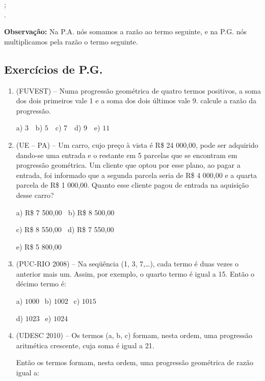 \begin{multicols*}{2}
	;\\

	.

	\textbf{Observação:} Na P.A. nós somamos a razão ao termo seguinte, e na P.G. nós multiplicamos pela razão o termo seguinte.

	\subsection{Exercícios de P.G.}

	\begin{enumerate}

		\item  (FUVEST) – Numa progressão geométrica de quatro termos positivos, a soma dos dois primeiros vale 1 e a soma dos dois últimos vale 9. calcule a razão da progressão.

		      a) $3 \ \ \ $ b) $5 \ \ \ $ c) $7 \ \ \ $ d) $9 \ \ \ $ e) $11$

		\item (UE – PA) – Um carro, cujo preço à vista é R\$ 24 000,00, pode ser adquirido dando-se uma entrada e o restante em 5 parcelas que se encontram em progressão geométrica. Um cliente que optou por esse plano, ao pagar a entrada, foi informado que a segunda parcela seria de R\$ 4 000,00 e a quarta parcela de R\$ 1 000,00. Quanto esse cliente pagou de entrada na aquisição desse carro?

		      a) R\$ 7 500,00 $ \ $ b) R\$ 8 500,00

		      c) R\$ 8 550,00 $ \ $ d) R\$ 7 550,00

		      e) R\$ 5 800,00

		\item  (PUC-RIO 2008) – Na seqüência (1, 3, 7,…), cada termo é duas vezes o anterior mais um. Assim, por exemplo, o quarto termo é igual a 15. Então o décimo termo é:

		      a) $1000 \ \ $ b) $1002 \ \ $ c) $1015 \ \ $

		      d) $1023 \ \ $ e) $1024 $

		\item (UDESC 2010) – Os termos (a, b, c) formam, nesta ordem, uma progressão aritmética crescente, cuja soma é igual a 21.

		      Então os termos formam, nesta ordem, uma progressão geométrica de razão igual a:


\end{enumerate}
\end{multicols*}
